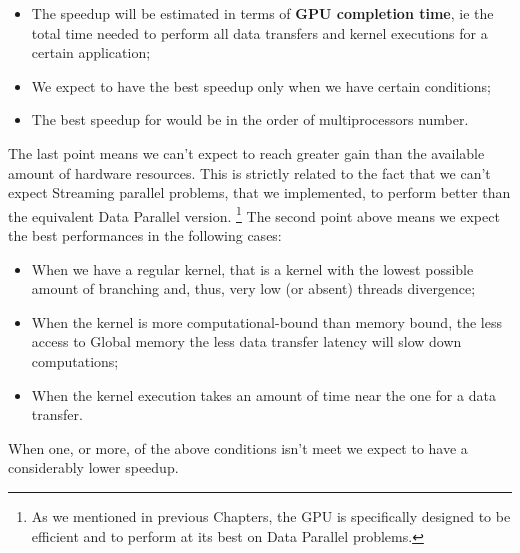 \begin{itemize}
	\item The speedup will be estimated in terms of \textbf{GPU completion time}, ie the total time needed to perform all data transfers and kernel executions for a certain application;
	\item We expect to have the best speedup only when we have certain conditions;
	\item The best speedup for would be in the order of multiprocessors number.
\end{itemize}
The last point means we can't expect to reach greater gain than the available amount of hardware resources. This is strictly related to the fact that we can't expect Streaming parallel problems, that we implemented, to perform better than the equivalent Data Parallel version. \footnote{As we mentioned in previous Chapters, the GPU is specifically designed to be efficient and to perform at its best on Data Parallel problems.}
The second point above means we expect the best performances in the following cases:
\begin{itemize}
	\item When we have a regular kernel, that is a kernel with the lowest possible amount of branching and, thus, very low (or absent) threads divergence;
	\item When the kernel is more computational-bound than memory bound, the less access to Global memory the less data transfer latency will slow down computations;
	\item When the kernel execution takes an amount of time near the one for a data transfer.
\end{itemize} 
When one, or more, of the above conditions isn't meet we expect to have a considerably lower speedup.


